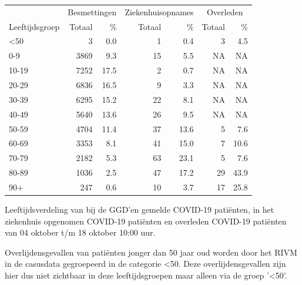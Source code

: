 \documentclass[
  english,
  man,floatsintext]{apa6}
\begin{document}
\begin{table}
\centering\begingroup\fontsize{11}{13}\selectfont

\begin{threeparttable}
\begin{tabular}{lrrrrrr}
\toprule
\multicolumn{1}{c}{ } & \multicolumn{2}{c}{Besmettingen} & \multicolumn{2}{c}{Ziekenhuisopnames} & \multicolumn{2}{c}{Overleden} \\
\cmidrule(l{3pt}r{3pt}){2-3} \cmidrule(l{3pt}r{3pt}){4-5} \cmidrule(l{3pt}r{3pt}){6-7}
Leeftijdsgroep & Totaal & \% & Totaal & \% & Totaal & \%\\
\midrule
<50 & 3 & 0.0 & 1 & 0.4 & 3 & 4.5\\
0-9 & 3869 & 9.3 & 15 & 5.5 & NA & NA\\
10-19 & 7252 & 17.5 & 2 & 0.7 & NA & NA\\
20-29 & 6836 & 16.5 & 9 & 3.3 & NA & NA\\
30-39 & 6295 & 15.2 & 22 & 8.1 & NA & NA\\
40-49 & 5640 & 13.6 & 26 & 9.5 & NA & NA\\
50-59 & 4704 & 11.4 & 37 & 13.6 & 5 & 7.6\\
60-69 & 3353 & 8.1 & 41 & 15.0 & 7 & 10.6\\
70-79 & 2182 & 5.3 & 63 & 23.1 & 5 & 7.6\\
80-89 & 1036 & 2.5 & 47 & 17.2 & 29 & 43.9\\
90+ & 247 & 0.6 & 10 & 3.7 & 17 & 25.8\\
\bottomrule
\end{tabular}
\begin{tablenotes}
\item[1] Leeftijdsverdeling van bij de GGD’en gemelde COVID-19 patiënten, in het ziekenhuis opgenomen COVID-19 patiënten en overleden COVID-19 patiënten van 04 oktober t/m 18 oktober 10:00 uur.
\item[2] Overlijdensgevallen van patiënten jonger dan 50 jaar oud worden door het RIVM in de casusdata gegroepeerd in de categorie <50. Deze overlijdensgevallen zijn hier dus niet zichtbaar in deze leeftijdsgroepen maar alleen via de groep '<50'.
\end{tablenotes}
\end{threeparttable}
\endgroup{}
\end{table}

\newpage
\end{document}

